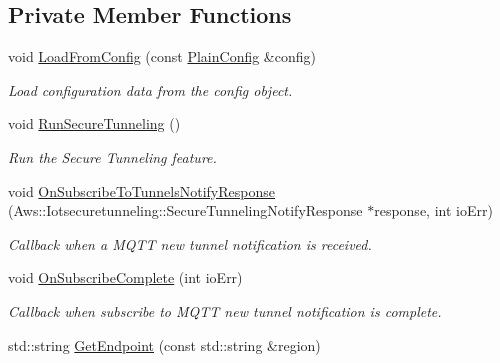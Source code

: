\subsection*{Private Member Functions}
\begin{DoxyCompactItemize}
\item 
void \hyperlink{class_aws_1_1_iot_1_1_device_client_1_1_secure_tunneling_1_1_secure_tunneling_feature_a72e0cfcb7782c86dc8e7595cac703009}{Load\+From\+Config} (const \hyperlink{struct_aws_1_1_iot_1_1_device_client_1_1_plain_config}{Plain\+Config} \&config)
\begin{DoxyCompactList}\small\item\em Load configuration data from the config object. \end{DoxyCompactList}\item 
\mbox{\label{class_aws_1_1_iot_1_1_device_client_1_1_secure_tunneling_1_1_secure_tunneling_feature_a5c65f96aad2c5018af0633f590d4af0c}} 
void \hyperlink{class_aws_1_1_iot_1_1_device_client_1_1_secure_tunneling_1_1_secure_tunneling_feature_a5c65f96aad2c5018af0633f590d4af0c}{Run\+Secure\+Tunneling} ()
\begin{DoxyCompactList}\small\item\em Run the Secure Tunneling feature. \end{DoxyCompactList}\item 
void \hyperlink{class_aws_1_1_iot_1_1_device_client_1_1_secure_tunneling_1_1_secure_tunneling_feature_ac865de9e5b5a8ae64911d9fcfc83750b}{On\+Subscribe\+To\+Tunnels\+Notify\+Response} (Aws\+::\+Iotsecuretunneling\+::\+Secure\+Tunneling\+Notify\+Response $\ast$response, int io\+Err)
\begin{DoxyCompactList}\small\item\em Callback when a M\+Q\+TT new tunnel notification is received. \end{DoxyCompactList}\item 
void \hyperlink{class_aws_1_1_iot_1_1_device_client_1_1_secure_tunneling_1_1_secure_tunneling_feature_ac883c84d52e745b2e58b039c60416d09}{On\+Subscribe\+Complete} (int io\+Err)
\begin{DoxyCompactList}\small\item\em Callback when subscribe to M\+Q\+TT new tunnel notification is complete. \end{DoxyCompactList}\item 
std\+::string \hyperlink{class_aws_1_1_iot_1_1_device_client_1_1_secure_tunneling_1_1_secure_tunneling_feature_a930dcd5d280ecc9ae591f6f9a8cf3c0a}{Get\+Endpoint} (const std\+::string \&region)

\end{DoxyCompactItemize}
